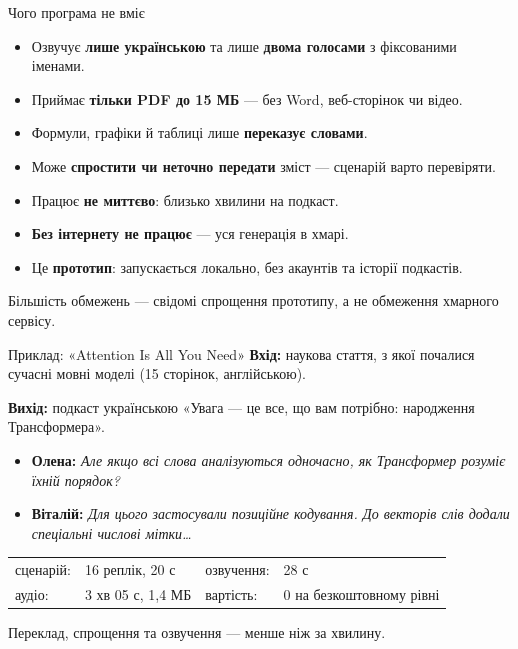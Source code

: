 \documentclass[aspectratio=43]{beamer}
\newcommand{\thesis}[1]{\begin{block}{}#1\end{block}}
\begin{document}
\begin{frame}{Чого програма не вміє}
  \begin{itemize}\small
    \item Озвучує \textbf{лише українською} та лише \textbf{двома голосами}
      з фіксованими іменами.
    \item Приймає \textbf{тільки PDF до 15 МБ} --- без Word, веб-сторінок
      чи відео.
    \item Формули, графіки й таблиці лише \textbf{переказує словами}.
    \item Може \textbf{спростити чи неточно передати} зміст --- сценарій
      варто перевіряти.
    \item Працює \textbf{не миттєво}: близько хвилини на подкаст.
    \item \textbf{Без інтернету не працює} --- уся генерація в хмарі.
    \item Це \textbf{прототип}: запускається локально, без акаунтів та
      історії подкастів.
  \end{itemize}

  \thesis{Більшість обмежень --- свідомі спрощення прототипу, а не
    обмеження хмарного сервісу.}
\end{frame}

\begin{frame}{Приклад: «Attention Is All You Need»}
  \textbf{Вхід:} наукова стаття, з якої почалися сучасні мовні моделі
  (15 сторінок, англійською).

  \vspace{0.5em}
  \textbf{Вихід:} подкаст українською «Увага --- це все, що вам потрібно:
  народження Трансформера».
  \begin{itemize}\small
    \item[] \textbf{Олена:} \emph{Але якщо всі слова аналізуються одночасно,
      як Трансформер розуміє їхній порядок?}
    \item[] \textbf{Віталій:} \emph{Для цього застосували позиційне кодування.
      До векторів слів додали спеціальні числові мітки…}
  \end{itemize}

  \small
  \begin{tabular}{@{}ll@{\qquad}ll@{}}
    сценарій: & 16 реплік, 20 с & озвучення: & 28 с \\
    аудіо: & 3 хв 05 с, 1,4 МБ & вартість: & 0 на безкоштовному рівні \\
  \end{tabular}
  \normalsize

  \thesis{Переклад, спрощення та озвучення --- менше ніж за хвилину.}
\end{frame}
\end{document}
